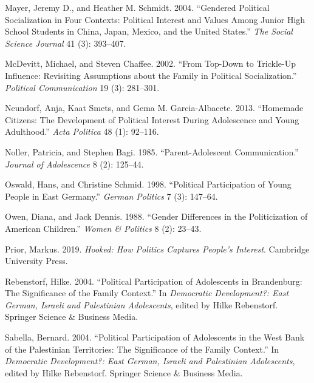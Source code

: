 \documentclass[
  letterpaper,
  DIV=11,
  numbers=noendperiod]{scrreprt}
\newlength{\cslhangindent}
\newlength{\cslentryspacingunit} %
\newenvironment{CSLReferences}[2] %
 {%
  \setlength{\parindent}{0pt}
  \ifodd #1
  \let\oldpar\par
  \def\par{\hangindent=\cslhangindent\oldpar}
  \fi
  \setlength{\parskip}{#2\cslentryspacingunit}
 }%
 {}
\begin{document}
\begin{CSLReferences}{1}{0}
\leavevmode{}%
Mayer, Jeremy D., and Heather M. Schmidt. 2004. {``{Gendered Political
Socialization in Four Contexts: Political Interest and Values Among
Junior High School Students in China, Japan, Mexico, and the United
States}.''} \emph{The Social Science Journal} 41 (3): 393--407.

\leavevmode{}%
McDevitt, Michael, and Steven Chaffee. 2002. {``{From Top-Down to
Trickle-Up Influence: Revisiting Assumptions about the Family in
Political Socialization}.''} \emph{Political Communication} 19 (3):
281--301.

\leavevmode{}%
Neundorf, Anja, Kaat Smets, and Gema M. Garcia-Albacete. 2013.
{``{Homemade Citizens: The Development of Political Interest During
Adolescence and Young Adulthood}.''} \emph{Acta Politica} 48 (1):
92--116.

\leavevmode{}%
Noller, Patricia, and Stephen Bagi. 1985. {``{Parent-Adolescent
Communication}.''} \emph{Journal of Adolescence} 8 (2): 125--44.

\leavevmode{}%
Oswald, Hans, and Christine Schmid. 1998. {``{Political Participation of
Young People in East Germany}.''} \emph{German Politics} 7 (3): 147--64.

\leavevmode{}%
Owen, Diana, and Jack Dennis. 1988. {``{Gender Differences in the
Politicization of American Children}.''} \emph{Women \& Politics} 8 (2):
23--43.

\leavevmode{}%
Prior, Markus. 2019. \emph{{Hooked: How Politics Captures People's
Interest}}. Cambridge University Press.

\leavevmode{}%
Rebenstorf, Hilke. 2004. {``{Political Participation of Adolescents in
Brandenburg: The Significance of the Family Context}.''} In
\emph{{Democratic Development?: East German, Israeli and Palestinian
Adolescents}}, edited by Hilke Rebenstorf. Springer Science \& Business
Media.

\leavevmode{}%
Sabella, Bernard. 2004. {``{Political Participation of Adolescents in
the West Bank of the Palestinian Territories: The Significance of the
Family Context}.''} In \emph{{Democratic Development?: East German,
Israeli and Palestinian Adolescents}}, edited by Hilke Rebenstorf.
Springer Science \& Business Media.


\end{CSLReferences}
\end{document}

